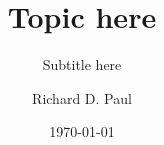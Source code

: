 \documentclass[serif]{beamer}
\title{Topic here}
\subtitle{Subtitle here}
\author{Richard D. Paul}
\institute[My Institute]{}
\date{\today}
\begin{document}
    \frame{\titlepage}
    
\end{document}
